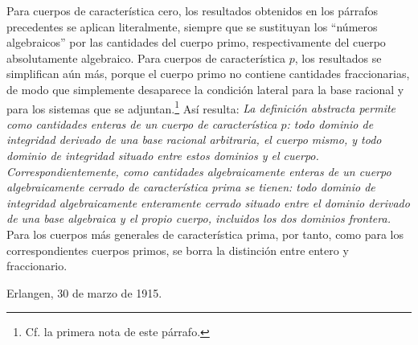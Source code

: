 \documentclass[11pt]{article}
\begin{document}
Para cuerpos de característica cero, los resultados obtenidos en los párrafos precedentes se aplican literalmente, siempre que se sustituyan los ``números algebraicos'' por las cantidades del cuerpo primo, respectivamente del cuerpo absolutamente algebraico. Para cuerpos de característica $p$, los resultados se simplifican aún más, porque el cuerpo primo no contiene cantidades fraccionarias, de modo que simplemente desaparece la condición lateral para la base racional y para los sistemas que se adjuntan.\footnote{Cf. la primera nota de este párrafo.} Así resulta: \emph{La definición abstracta permite como cantidades enteras de un cuerpo de característica $p$: todo dominio de integridad derivado de una base racional arbitraria, el cuerpo mismo, y todo dominio de integridad situado entre estos dominios y el cuerpo. Correspondientemente, como cantidades algebraicamente enteras de un cuerpo algebraicamente cerrado de característica prima se tienen: todo dominio de integridad algebraicamente enteramente cerrado situado entre el dominio derivado de una base algebraica y el propio cuerpo, incluidos los dos dominios frontera.} Para los cuerpos más generales de característica prima, por tanto, como para los correspondientes cuerpos primos, se borra la distinción entre entero y fraccionario.

\medskip
\noindent Erlangen, 30 de marzo de 1915.
\end{document}
